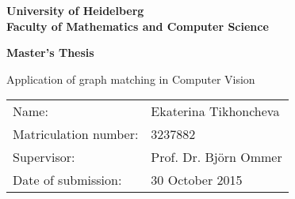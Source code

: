 \begin{titlepage}
\begin{center}
\textbf{ 
\Large University of Heidelberg\\
\smallskip
\Large Faculty of Mathematics and Computer Science\\
\smallskip
\vspace{0.5\baselineskip}{\Large
Computer Vision group \linebreak
at \linebreak
Heidelberg Collaboratory for Image Processing%
}
}

\vspace{3.0cm}

\textbf{\large Master's Thesis} 

\vspace{0.5\baselineskip}
{\huge
Application of graph matching in Computer Vision
}
\end{center}

\vfill 

{\large
\begin{tabular}[l]{ll}
Name: & Ekaterina Tikhoncheva\\
Matriculation number: & 3237882\\
Supervisor: & Prof. Dr. Bj\"{o}rn Ommer\\
Date of submission: & 30 October 2015
\end{tabular}
}
\end{titlepage}